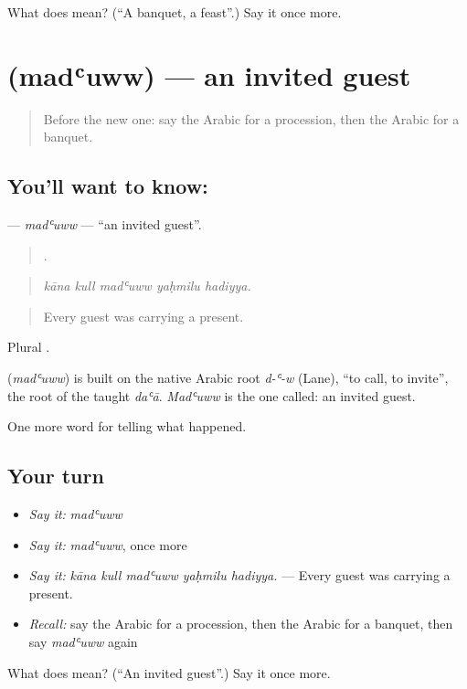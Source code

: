 \begin{tcolorbox}[breakable,colback=teal!4,colframe=teal!35!black,title={Before you move on}]
What does  mean? (\textquotedblleft{}A banquet, a feast\textquotedblright{}.) Say it once more.
\end{tcolorbox}
\section[\texorpdfstring{\ar{مدعو} (madʿuww)}{مدعو (madʿuww)}]{ (madʿuww) — an invited guest}

\label{lesson:AR-C328-maduww}



\begin{quote}
Before the new one: say the Arabic for a procession, then the Arabic for a banquet.
\end{quote}

\subsection*{You'll want to know: }
\textbf{} — \emph{madʿuww} — \textquotedblleft{}an invited guest\textquotedblright{}.

\begin{quote}
    .
\end{quote}

\begin{quote}
\emph{kāna kull madʿuww yaḥmilu hadiyya.}
\end{quote}

\begin{quote}
Every guest was carrying a present.
\end{quote}

Plural .

\begin{cousinweb}
\textbf{} (\emph{madʿuww}) is built on the native Arabic root \emph{d-ʿ-w} (Lane), \textquotedblleft{}to call, to invite\textquotedblright{}, the root of the taught \emph{daʿā}. \emph{Madʿuww} is the one called: an invited guest.
\end{cousinweb}

\begin{grammarlens}[title={What you've built}]
One more word for telling what happened.
\end{grammarlens}

\subsection*{Your turn}
\begin{itemize}
\raggedright
  \item \emph{Say it:} \emph{madʿuww}
  \item \emph{Say it:} \emph{madʿuww}, once more
  \item \emph{Say it:} \emph{kāna kull madʿuww yaḥmilu hadiyya.} — Every guest was carrying a present.
  \item \emph{Recall:} say the Arabic for a procession, then the Arabic for a banquet, then say \emph{madʿuww} again
\end{itemize}

\begin{tcolorbox}[breakable,colback=teal!4,colframe=teal!35!black,title={Before you move on}]
What does  mean? (\textquotedblleft{}An invited guest\textquotedblright{}.) Say it once more.
\end{tcolorbox}

